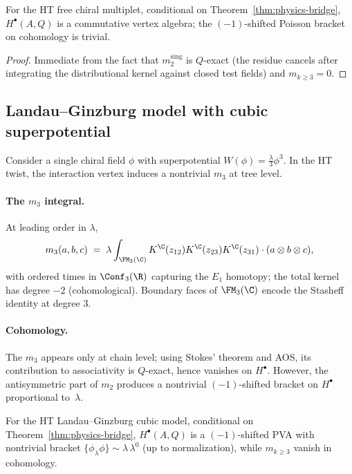 \begin{proposition}
\label{prop:PVA-free}
For the HT free chiral multiplet, conditional on Theorem~\ref{thm:physics-bridge}, $H^\bullet(A,Q)$ is a commutative vertex algebra; the $(-1)$-shifted Poisson bracket on cohomology is trivial.
\end{proposition}

\begin{proof}
Immediate from the fact that $m_2^{\mathrm{sing}}$ is $Q$-exact (the residue cancels after integrating the distributional kernel against closed test fields) and $m_{k\ge3}=0$.
\end{proof}

\subsection{Landau--Ginzburg model with cubic superpotential}
\label{subsec:LG-cubic}
Consider a single chiral field $\phi$ with superpotential $W(\phi)=\frac{\lambda}{3}\phi^3$.
In the HT twist, the interaction vertex induces a nontrivial $m_3$ at tree level.

\paragraph{The $m_3$ integral.}
At leading order in $\lambda$,
\[
m_3(a,b,c) \;=\; \lambda \int_{\FM_3(\C)} K^{\C}(z_{12})K^{\C}(z_{23})K^{\C}(z_{31}) \cdot (a\otimes b\otimes c),
\]
with ordered times in $\Conf_3(\R)$ capturing the $E_1$ homotopy; the total kernel has degree $-2$ (cohomological). Boundary faces of $\FM_3(\C)$ encode the Stasheff identity at degree $3$.

\paragraph{Cohomology.}
The $m_3$ appears only at chain level; using Stokes' theorem and AOS, its contribution to associativity is $Q$-exact, hence vanishes on $H^\bullet$. However, the antisymmetric part of $m_2$ produces a nontrivial $(-1)$-shifted bracket on $H^\bullet$ proportional to~$\lambda$.

\begin{proposition}
\label{prop:PVA-LG}
For the HT Landau--Ginzburg cubic model, conditional on Theorem~\ref{thm:physics-bridge}, $H^\bullet(A,Q)$ is a $(-1)$-shifted PVA with nontrivial bracket $\{\phi_\lambda \phi\}\sim \lambda\, \lambda^0$ (up to normalization), while $m_{k\ge3}$ vanish in cohomology.
\end{proposition}

